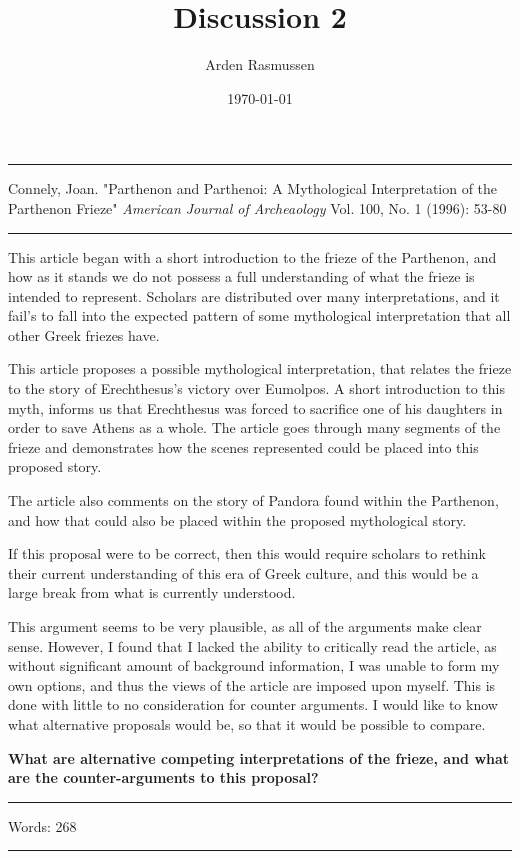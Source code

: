 \documentclass[12pt]{amsart}
\title{Discussion 2}
\author{Arden Rasmussen}
\date{\today}
\begin{document}
\maketitle

\par\noindent\rule{\textwidth}{0.4pt}

\begin{hangparas}{.25in}{1}
  Connely, Joan. "Parthenon and Parthenoi: A Mythological Interpretation of the
  Parthenon Frieze" \textit{American Journal of Archeaology} Vol. 100, No. 1
  (1996): 53-80
\end{hangparas}

\par\noindent\rule{\textwidth}{0.4pt}

This article began with a short introduction to the frieze of the Parthenon,
and how as it stands we do not possess a full understanding of what the frieze
is intended to represent. Scholars are distributed over many interpretations,
and it fail's to fall into the expected pattern of some mythological
interpretation that all other Greek friezes have.

This article proposes a possible mythological interpretation, that relates the
frieze to the story of Erechthesus's victory over Eumolpos. A short
introduction to this myth, informs us that Erechthesus was forced to sacrifice
one of his daughters in order to save Athens as a whole. The article goes
through many segments of the frieze and demonstrates how the scenes represented
could be placed into this proposed story.

The article also comments on the story of Pandora found within the Parthenon,
and how that could also be placed within the proposed mythological story.

If this proposal were to be correct, then this would require scholars to
rethink their current understanding of this era of Greek culture, and this
would be a large break from what is currently understood.

This argument seems to be very plausible, as all of the arguments make clear
sense. However, I found that I lacked the ability to critically read the
article, as without significant amount of background information, I was unable
to form my own options, and thus the views of the article are imposed upon
myself. This is done with little to no consideration for counter arguments. I
would like to know what alternative proposals would be, so that it would be
possible to compare.

\textbf{What are alternative competing interpretations of the frieze, and what
are the counter-arguments to this proposal?} 

\par\noindent\rule{\textwidth}{0.4pt}

Words: 268

\par\noindent\rule{\textwidth}{0.4pt}
\end{document}
